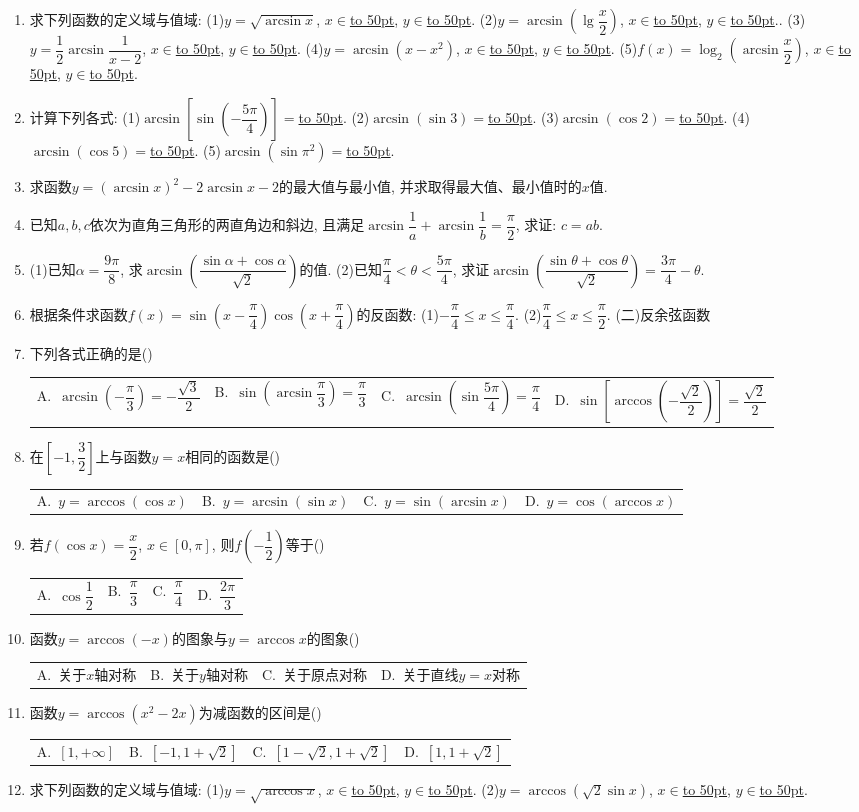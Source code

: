 \documentclass[10pt,a4paper]{article}
\newcommand{\blank}[1]{\underline{\hbox to #1pt{}}}
\newcommand{\fourch}[4]{\par\begin{tabular}{p{.23\textwidth}p{.23\textwidth}p{.23\textwidth}p{.23\textwidth}}
A.~#1 &B.~#2& C.~#3& D.~#4
\end{tabular}}
\begin{document}
\begin{enumerate}[1.]
\item 求下列函数的定义域与值域:
(1)$y=\sqrt {\arcsin x}$, $x\in$\blank{50}, $y\in$\blank{50}.
(2)$y=\arcsin (\lg \dfrac x2)$, $x\in$\blank{50}, $y\in$\blank{50}..
(3)$y=\dfrac 12\arcsin \dfrac 1{x-2}$, $x\in$\blank{50}, $y\in$\blank{50}.
(4)$y=\arcsin (x-x^2)$, $x\in$\blank{50}, $y\in$\blank{50}.
(5)$f(x)=\log _2(\arcsin \dfrac x2)$, $x\in$\blank{50}, $y\in$\blank{50}.
\item 计算下列各式:
(1)$\arcsin [\sin (-\dfrac{5\pi }4)]=$\blank{50}.		(2)$\arcsin (\sin 3)=$\blank{50}.
(3)$\arcsin (\cos 2)=$\blank{50}.			(4)$\arcsin (\cos 5)=$\blank{50}.
(5)$\arcsin (\sin \pi ^2)=$\blank{50}.
\item 求函数$y=(\arcsin x)^2-2\arcsin x-2$的最大值与最小值, 并求取得最大值、最小值时的$x$值.
\item 已知$a,b,c$依次为直角三角形的两直角边和斜边, 且满足$\arcsin \dfrac 1a+\arcsin \dfrac 1b=\dfrac{\pi }2$, 求证: $c=ab$.
\item (1)已知$\alpha =\dfrac{9\pi }8$, 求$\arcsin (\dfrac{\sin \alpha +\cos \alpha }{\sqrt 2})$的值.
(2)已知$\dfrac{\pi }4<\theta <\dfrac{5\pi }4$, 求证$\arcsin (\dfrac{\sin \theta +\cos \theta }{\sqrt 2})=\dfrac{3\pi }4-\theta$.
\item 根据条件求函数$f(x)=\sin (x-\dfrac{\pi }4)\cos (x+\dfrac{\pi }4)$的反函数:
(1)$-\dfrac{\pi }4\le x\le \dfrac{\pi }4$.						(2)$\dfrac{\pi }4\le x\le \dfrac{\pi }2$.
(二)反余弦函数
\item 下列各式正确的是()
\fourch{$\arcsin (-\dfrac{\pi }3)=-\dfrac{\sqrt 3}2$}{$\sin (\arcsin \dfrac{\pi }3)=\dfrac{\pi }3$}{$\arcsin (\sin \dfrac{5\pi }4)=\dfrac{\pi }4$}{$\sin [\arccos (-\dfrac{\sqrt 2}2)]=\dfrac{\sqrt 2}2$}
\item 在$[-1,\dfrac 32]$上与函数$y=x$相同的函数是()
\fourch{$y=\arccos (\cos x)$}{$y=\arcsin (\sin x)$}{$y=\sin (\arcsin x)$}{$y=\cos (\arccos x)$}
\item 若$f(\cos x)=\dfrac x2$, $x\in [0,\pi]$, 则$f(-\dfrac 12)$等于()
\fourch{$\cos \dfrac 12$}{$\dfrac{\pi }3$}{$\dfrac{\pi }4$}{$\dfrac{2\pi }3$}
\item 函数$y=\arccos (-x)$的图象与$y=\arccos x$的图象()
\fourch{关于$x$轴对称}{关于$y$轴对称}{关于原点对称}{关于直线$y=x$对称}
\item 函数$y=\arccos (x^2-2x)$为减函数的区间是()
\fourch{$[1,+\infty]$}{$[-1,1+\sqrt 2]$}{$[1-\sqrt 2,1+\sqrt 2]$}{$[1,1+\sqrt 2]$}
\item 求下列函数的定义域与值域:
(1)$y=\sqrt {\arccos x}$, $x\in$\blank{50}, $y\in$\blank{50}.
(2)$y=\arccos (\sqrt 2\sin x)$, $x\in$\blank{50}, $y\in$\blank{50}.

\end{enumerate}
\end{document}
